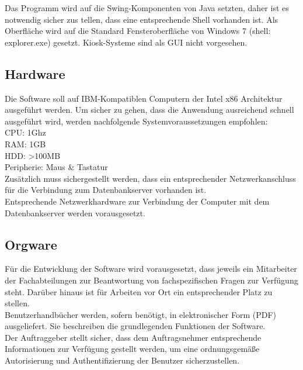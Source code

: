 Das Programm wird auf die Swing-Komponenten von Java setzten, daher ist es notwendig sicher zus tellen, dass eine entsprechende Shell vorhanden ist.
Als Oberfläche wird auf die Standard Fensteroberfläche von Windows 7 (shell: explorer.exe) gesetzt. Kiosk-Systeme sind als GUI nicht vorgesehen. \\


\subsection{Hardware}
\label{subsec:hardware}

Die Software soll auf IBM-Kompatiblen Computern der Intel x86 Architektur ausgeführt werden.
Um sicher zu gehen, dass die Anwendung ausreichend schnell ausgeführt wird, werden nachfolgende Systemvoraussetzungen empfohlen:\\

CPU: 1Ghz\\
RAM: 1GB\\
HDD: >100MB\\
Peripherie: Maus \& Tastatur\\

Zusätzlich muss sichergestellt werden, dass ein entsprechender Netzwerkanschluss für die Verbindung zum Datenbankserver vorhanden ist.\\

Entsprechende Netzwerkhardware zur Verbindung der Computer mit dem Datenbankserver werden vorausgesetzt.\\

\subsection{Orgware}
\label{subsec:orgware}

Für die Entwicklung der Software wird vorausgesetzt, dass jeweils ein Mitarbeiter der Fachabteilungen zur Beantwortung von fachspezifischen Fragen zur Verfügung steht. Darüber hinaus ist für Arbeiten vor Ort ein entsprechender Platz zu stellen.\\

Benutzerhandbücher werden, sofern benötigt, in elektronischer Form (PDF) ausgeliefert. Sie beschreiben die grundlegenden Funktionen der Software.\\

Der Auftraggeber stellt sicher, dass dem Auftragsnehmer entsprechende Informationen zur Verfügung gestellt werden, um eine ordnungsgemäße Autorisierung und Authentifizierung der Benutzer sicherzustellen.\\

